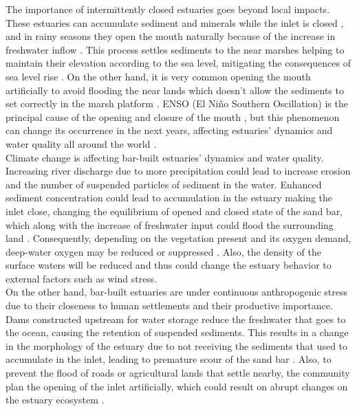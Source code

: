 \documentclass[tesis.tex]{subfiles}
\begin{document}
The importance of intermittently closed estuaries goes beyond local impacts. These estuaries can accumulate sediment and minerals while the inlet is closed \citep{thorne2021wetlands}, and in rainy seasons they open the mouth naturally because of the increase in freshwater inflow \citep{hoeksema2018factors}. This process settles sediments to the near marshes helping to maintain their elevation according to the sea level, mitigating the consequences of sea level rise \citep{thorne2021wetlands}. On the other hand, it is very common opening the mouth artificially to avoid flooding the near lands \citep{Behrens2013} which doesn't allow the sediments to set correctly in the marsh platform  \citep{thorne2021wetlands}. ENSO (El Niño Southern Oscillation) is the principal cause of the opening and closure of the mouth \citep{mcsweeney2017intermittently}, but this phenomenon can change its occurrence in the next years, affecting estuaries' dynamics and water quality all around the world \citep{thorne2021wetlands}.\\

Climate change is affecting bar-built estuaries' dynamics and water quality. Increasing river discharge due to more precipitation could lead to increase erosion and the number of suspended particles of sediment in the water. Enhanced sediment concentration could lead to accumulation in the estuary making the inlet close, changing the equilibrium of opened and closed state of the sand bar, which along with the increase of freshwater input could flood the surrounding land \citep{peeters2009currents}. Consequently, depending on the vegetation present and its oxygen demand, deep-water oxygen may be reduced or suppressed \citep{Kelly2018, Largier2021}. Also, the density of the surface waters will be reduced and thus could change the estuary behavior to external factors such as wind stress. \\

On the other hand, bar-built estuaries are under continuous anthropogenic stress due to their closeness to human settlements \citep{clark2019systematic} and their productive importance. Dams constructed upstream for water storage reduce the freshwater that goes to the ocean, causing the retention of suspended sediments. This results in a change in the morphology of the estuary due to not receiving the sediments that used to accumulate in the inlet, leading to premature scour of the sand bar \citep{peeters2009currents}. Also, to prevent the flood of roads or agricultural lands that settle nearby, the community plan the opening of the inlet artificially, which could result on abrupt changes on the estuary ecosystem \cite{Behrens2013}. \\
\end{document}

